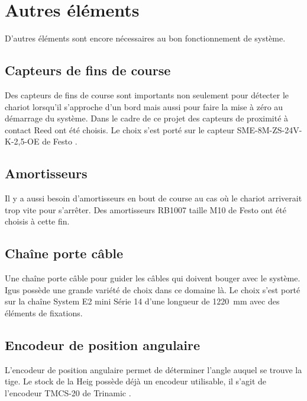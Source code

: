 \section{Autres éléments}\label{sec:AutreEle}
D'autres éléments sont encore nécessaires au bon fonctionnement de système.

\subsection{Capteurs de fins de course}
Des capteurs de fins de course sont importants non seulement pour détecter le chariot lorsqu'il s'approche d'un bord mais aussi
pour faire la mise à zéro au démarrage du système. Dans le cadre de ce projet des capteurs de proximité à contact Reed ont été choisis.
Le choix s'est porté sur le capteur SME-8M-ZS-24V-K-2,5-OE de Festo \cite{Festo}.

\subsection{Amortisseurs}
Il y a aussi besoin d'amortisseurs en bout de course au cas où le chariot arriverait trop vite pour s'arrêter. Des amortisseurs RB1007 taille M10
de Festo \cite{Festo} ont été choisis à cette fin.

\subsection{Chaîne porte câble}
Une chaîne porte câble pour guider les câbles qui doivent bouger avec le système. Igus \cite{Igus} possède une grande variété de choix dans
ce domaine là. Le choix s'est porté sur la chaîne System E2 mini Série 14 d'une longueur de 1220~mm avec des éléments de fixations.

\subsection{Encodeur de position angulaire}
L'encodeur de position angulaire permet de déterminer l'angle auquel se trouve la tige. Le stock de la \acrshort{Heig} possède déjà un encodeur
utilisable, il s'agit de l'encodeur TMCS-20 de Trinamic \cite{Trinamic}.